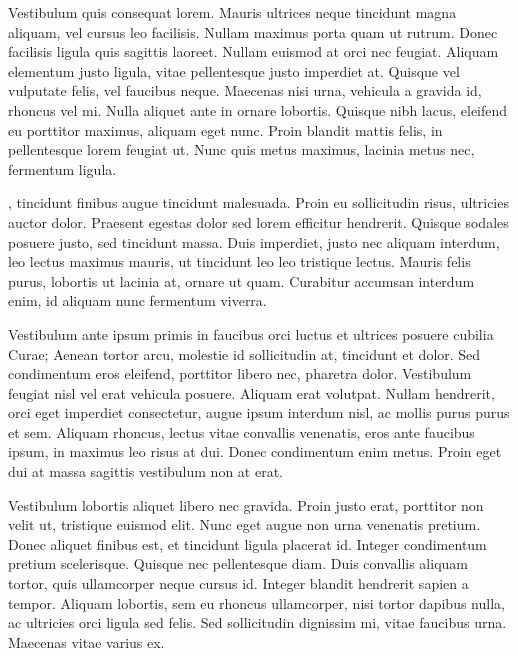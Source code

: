 \documentclass{article}
\begin{document}
Vestibulum quis consequat lorem. Mauris ultrices neque tincidunt magna aliquam, vel cursus leo facilisis. Nullam maximus porta quam ut rutrum. Donec facilisis ligula quis sagittis laoreet. Nullam euismod at orci nec feugiat. Aliquam elementum justo ligula, vitae pellentesque justo imperdiet at. Quisque vel vulputate felis, vel faucibus neque. Maecenas nisi urna, vehicula a gravida id, rhoncus vel mi. Nulla aliquet ante in ornare lobortis. Quisque nibh lacus, eleifend eu porttitor maximus, aliquam eget nunc. Proin blandit mattis felis, in pellentesque lorem feugiat ut. Nunc quis metus maximus, lacinia metus nec, fermentum ligula.

, tincidunt finibus augue tincidunt malesuada. Proin eu sollicitudin risus, ultricies auctor dolor. Praesent egestas dolor sed lorem efficitur hendrerit. Quisque sodales posuere justo, sed tincidunt massa. Duis imperdiet, justo nec aliquam interdum, leo lectus maximus mauris, ut tincidunt leo leo tristique lectus. Mauris felis purus, lobortis ut lacinia at, ornare ut quam. Curabitur accumsan interdum enim, id aliquam nunc fermentum viverra.

Vestibulum ante ipsum primis in faucibus orci luctus et ultrices posuere cubilia Curae; Aenean tortor arcu, molestie id sollicitudin at, tincidunt et dolor. Sed condimentum eros eleifend, porttitor libero nec, pharetra dolor. Vestibulum feugiat nisl vel erat vehicula posuere. Aliquam erat volutpat. Nullam hendrerit, orci eget imperdiet consectetur, augue ipsum interdum nisl, ac mollis purus purus et sem. Aliquam rhoncus, lectus vitae convallis venenatis, eros ante faucibus ipsum, in maximus leo risus at dui. Donec condimentum enim metus. Proin eget dui at massa sagittis vestibulum non at erat.

Vestibulum lobortis aliquet libero nec gravida. Proin justo erat, porttitor non velit ut, tristique euismod elit. Nunc eget augue non urna venenatis pretium. Donec aliquet finibus est, et tincidunt ligula placerat id. Integer condimentum pretium scelerisque. Quisque nec pellentesque diam. Duis convallis aliquam tortor, quis ullamcorper neque cursus id. Integer blandit hendrerit sapien a tempor. Aliquam lobortis, sem eu rhoncus ullamcorper, nisi tortor dapibus nulla, ac ultricies orci ligula sed felis. Sed sollicitudin dignissim mi, vitae faucibus urna. Maecenas vitae varius ex.
\end{document}
